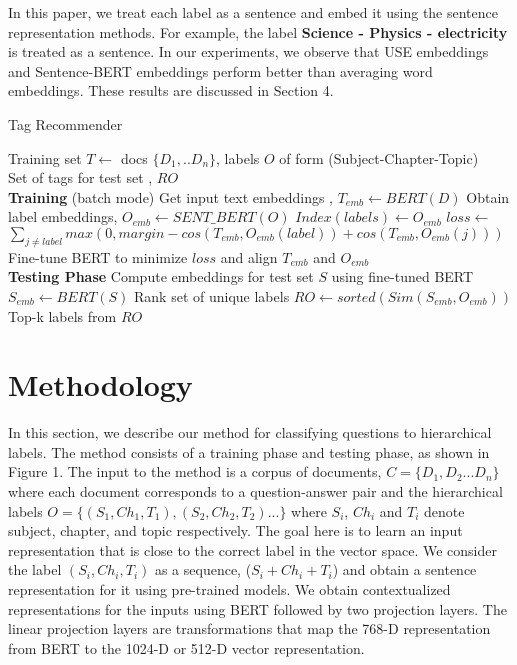 \documentclass[runningheads, envcountsame, a4paper]{llncs}
\begin{document}
\setlength{\parindent}{4ex}In this paper, we treat each label as a sentence and embed it using the sentence representation methods. For example, the label \textbf{Science - Physics - electricity} is treated as a sentence. In our experiments, we observe that USE embeddings and Sentence-BERT embeddings perform better than averaging word embeddings. These results are discussed in Section 4.
 \begin{algorithm}
 \caption{Tag Recommender}
 \label{algoBO}
 \begin{algorithmic}[1]
 \renewcommand{\algorithmicrequire}{\textbf{Input:}}
 \renewcommand{\algorithmicensure}{\textbf{Output:}}
 \REQUIRE Training set $T \gets $ docs $\{D_1,..D_n\}$, labels $O$ of form (Subject-Chapter-Topic)\\
 \ENSURE  Set of tags for test set , $RO$
  \\ \textbf{Training} (batch mode)
  \STATE Get input text embeddings , $T_{emb} \gets BERT(D)$
  \STATE Obtain label embeddings, $O_{emb} \gets SENT\_BERT(O)$ 
  \STATE $Index(labels) \gets O_{emb}$
    \STATE  $loss\gets$ $\sum_{j \neq label}max(0,margin-cos(T_{emb},O_{emb}(label))+cos(T_{emb},O_{emb}(j)))$
    \STATE Fine-tune BERT to minimize $loss$ and align $T_{emb}$ and $O_{emb}$
 \\ \textbf{Testing Phase}
 \STATE Compute embeddings for test set $S$ using fine-tuned BERT $S_{emb} \gets BERT(S)$
 \STATE Rank set of unique labels $RO \gets sorted(Sim(S_{emb},O_{emb}))$
 \RETURN Top-k labels from $RO$
 \end{algorithmic} 
 \end{algorithm}
\section{Methodology}
In this section, we describe our method for classifying questions to  hierarchical labels. The method consists of a training phase and testing phase, as shown in Figure 1. The input to the method is a corpus of documents, $C=\{D_1,D_2...D_n\}$ where each document corresponds to a question-answer pair and the hierarchical labels $O=\{(S_1,Ch_1,T_1),(S_2,Ch_2,T_2)...\}$ where $S_i$,
$Ch_i$ and $T_i$ denote subject, chapter, and topic respectively. The goal here is to learn an input representation that is close to the correct label in the vector space. We consider the label $(S_i,Ch_i,T_i)$ as a sequence, ($S_i+Ch_i+T_i$) and obtain a sentence representation for it using pre-trained models. We obtain contextualized representations for the inputs using BERT \cite{BERT} followed by two projection layers. The linear projection layers are transformations that map the 768-D representation from BERT to the 1024-D or 512-D vector representation.
\end{document}
